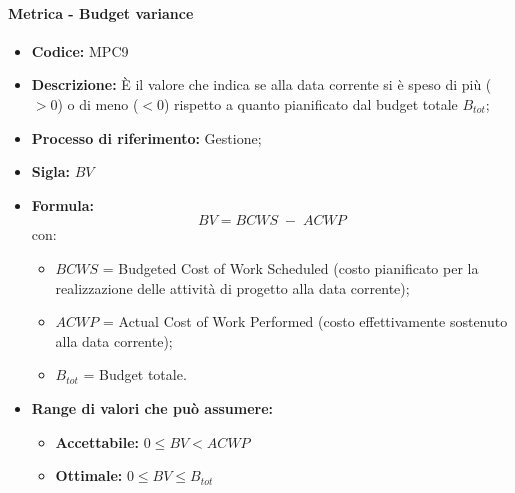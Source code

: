     \paragraph{Metrica - Budget variance}
        \begin{itemize}
            \item \textbf{Codice:} MPC9
            \item \textbf{Descrizione:} È il valore che indica se alla data corrente si è speso di più ($>0$) o di meno ($<0$) rispetto a quanto pianificato dal budget totale $B_{tot}$;
            \item \textbf{Processo di riferimento:} Gestione;
            \item \textbf{Sigla:} $BV$
            \item \textbf{Formula:} $$BV = {BCWS \; - \; ACWP}$$
            con:
            \begin{itemize}
                \item $BCWS$ = Budgeted Cost of Work Scheduled (costo pianificato per la realizzazione delle attività di progetto alla data corrente);
                \item $ACWP$ = Actual Cost of Work Performed (costo effettivamente sostenuto alla data corrente);
                \item $B_{tot}$ = Budget totale.
            \end{itemize}
            \item \textbf{Range di valori che può assumere:}
            \begin{itemize}
                \item \textbf{Accettabile:} $0 \leq BV < ACWP$
                \item \textbf{Ottimale:} $0 \leq BV \leq B_{tot}$
            \end{itemize}
        \end{itemize}

\newpage %

